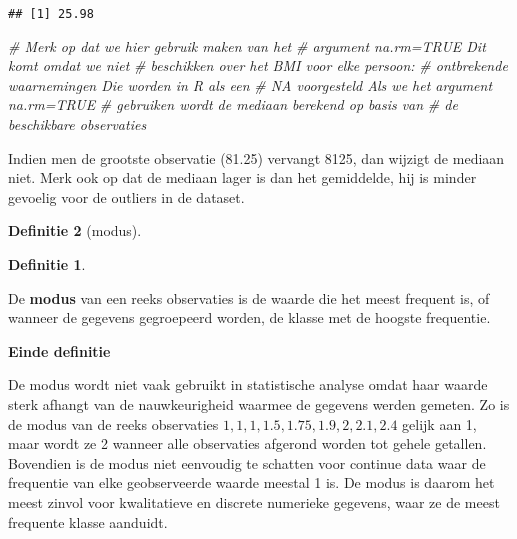 \documentclass[
  12pt,dutch,coursenotes]{book}
\newenvironment{Shaded}{\begin{snugshade}}{\end{snugshade}}
\newcommand{\CommentTok}[1]{\textcolor[rgb]{0.56,0.35,0.01}{\textit{#1}}}
\theoremstyle{definition}
\newtheorem{definition}{Definitie}[chapter]
\theoremstyle{definition}
\theoremstyle{definition}
\theoremstyle{remark}
\begin{document}
\begin{verbatim}
## [1] 25.98
\end{verbatim}

\begin{Shaded}
\begin{Highlighting}[]
\CommentTok{\# Merk op dat we hier gebruik maken van het}
\CommentTok{\# argument na.rm=TRUE Dit komt omdat we niet}
\CommentTok{\# beschikken over het BMI voor elke persoon:}
\CommentTok{\# ontbrekende waarnemingen Die worden in R als een}
\CommentTok{\# NA voorgesteld Als we het argument na.rm=TRUE}
\CommentTok{\# gebruiken wordt de mediaan berekend op basis van}
\CommentTok{\# de beschikbare observaties}
\end{Highlighting}
\end{Shaded}

Indien men de grootste observatie (81.25) vervangt 8125, dan wijzigt de mediaan niet.
Merk ook op dat de mediaan lager is dan het gemiddelde, hij is minder gevoelig voor de outliers in de dataset.

\begin{definition}[modus]
\begin{definition}

\protect\hypertarget{def:unnamed-chunk-97}{}{\label{def:unnamed-chunk-97} \iffalse (modus) \fi{} }

\end{definition}
\end{definition}

De \textbf{modus} van een reeks observaties is de waarde die het meest
frequent is, of wanneer de gegevens gegroepeerd worden, de klasse met de
hoogste frequentie.

\textbf{Einde definitie}

De modus wordt niet vaak gebruikt in statistische analyse omdat haar waarde
sterk afhangt van de nauwkeurigheid waarmee de gegevens werden gemeten. Zo
is de modus van de reeks observaties \(1, 1, 1, 1.5, 1.75, 1.9, 2, 2.1, 2.4\)
gelijk aan 1, maar wordt ze 2 wanneer alle observaties afgerond worden tot
gehele getallen. Bovendien is de modus niet eenvoudig te schatten voor
continue data waar de frequentie van elke geobserveerde waarde meestal 1 is.
De modus is daarom het meest zinvol voor kwalitatieve en discrete numerieke
gegevens, waar ze de meest frequente klasse aanduidt.
\end{document}
